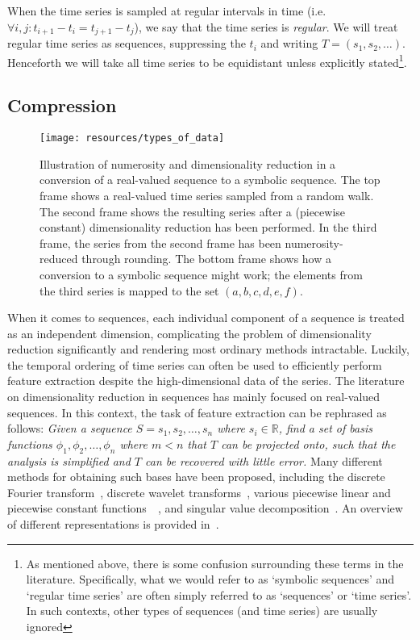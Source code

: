 When the time series is sampled at regular intervals in time (i.e.\ $\forall i, j: t_{i+1} - t_i = t_{j+1} - t_j$), we say that the time series is \emph{regular}. We will treat regular time series as sequences, suppressing the $t_i$ and writing $T = (s_1, s_2, \dots)$. Henceforth we will take all time series to be equidistant unless explicitly stated\footnote{As mentioned above, there is some confusion surrounding these terms in the literature. Specifically, what we would refer to as `symbolic sequences' and `regular time series' are often simply referred to as `sequences' or `time series'. In such contexts, other types of sequences (and time series) are usually ignored}.

\subsection{Compression}
\label{sect:compression}

\begin{figure}[htb]
  \begin{center}
    \leavevmode
    \texttt{[image: resources/types\_of\_data]}
  \end{center}
  \caption{\small{Illustration of numerosity and dimensionality reduction in a conversion of a real-valued sequence to a symbolic sequence. The top frame shows a real-valued time series sampled from a random walk. The second frame shows the resulting series after a (piecewise constant) dimensionality reduction has been performed. In the third frame, the series from the second frame has been numerosity-reduced through rounding. The bottom frame shows how a conversion to a symbolic sequence might work; the elements from the third series is mapped to the set $(a,b,c,d,e,f)$.}}
\label{fig:types_of_data}
\end{figure}

When it comes to sequences, each individual component of a sequence is treated as an independent dimension, complicating the problem of dimensionality reduction significantly and rendering most ordinary methods intractable. Luckily, the temporal ordering of time series can often be used to efficiently perform feature extraction despite the high-dimensional data of the series. The literature on dimensionality reduction in sequences has mainly focused on real-valued sequences. In this context, the task of feature extraction can be rephrased as follows: \emph{Given a sequence $S = s_1, s_2, \dots, s_n$ where $s_i \in \mathbb{R}$, find a set of basis functions $\phi_1, \phi_2, \dots, \phi_n$ where $m < n$ that $T$ can be projected onto, such that the analysis is simplified and $T$ can be recovered with little error.} Many different methods for obtaining such bases have been proposed, including the discrete Fourier transform~\cite{faloutsos1}, discrete wavelet transforms~\cite{pong}, various piecewise linear and piecewise constant functions~\cite{keogh3}~\cite{geurts}, and singular value decomposition~\cite{keogh3}. An overview of different representations is provided in~\cite{fabian}.

